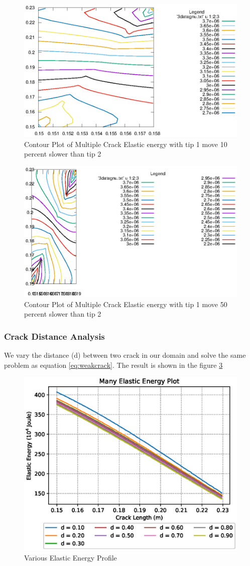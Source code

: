 \documentclass[a4paper,11pt]{article}
\begin{document}
\begin{figure}[h]
	\centering
	\includegraphics[width=0.7\linewidth]{picture/conference/elasticdouble-tip2}
	\caption{Contour Plot of Multiple Crack Elastic energy with tip 1 move 10 percent slower than tip 2}
	\label{fig:elasticdouble-tip2}
\end{figure}
\begin{figure}[h]
	\centering
	\includegraphics[width=0.7\linewidth]{picture/conference/elasticdouble-tip105}
	\caption{Contour Plot of Multiple Crack Elastic energy with tip 1 move 50 percent slower than tip 2}
	\label{fig:elasticdouble-tip105}
\end{figure}
\iffalse
\subsubsection{Crack Distance Analysis}
We vary the distance (d) between two crack in our domain and solve the same problem as equation \ref{eq:weakcrack}. The result is shown in the figure \ref{fig:manyelastic-lvar}
\begin{figure}[h!]
	\centering
	\includegraphics[width=0.8\linewidth]{picture/conference/manyelastic-lvar}
	\caption{Various Elastic Energy Profile}
	\label{fig:manyelastic-lvar}
\end{figure}
\end{document}
